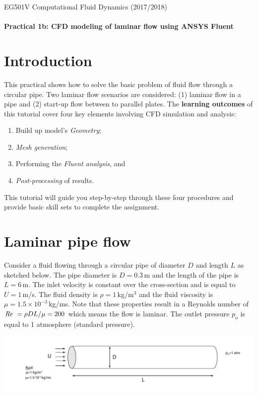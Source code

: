 \documentclass[11pt,a4paper,oneside,hidelinks]{scrartcl}
\newcommand\Rey{\mbox{\textit{Re}}\,\,}
\begin{document}
EG501V Computational Fluid Dynamics (2017/2018)
\\
\\
\textbf{Practical 1b: CFD modeling of laminar flow using ANSYS Fluent}

\section{Introduction}
This practical shows how to solve the basic problem of fluid flow through a circular pipe. Two laminar flow scenarios are considered: (1) laminar flow in a pipe and (2) start-up flow between to parallel plates. The {\bf learning outcomes} of this tutorial cover four key elements involving CFD simulation and  analysis:
\begin{enumerate}
  \item Build up model's \emph{Geometry};
  \item \emph{Mesh generation};
  \item Performing the \emph{Fluent analysis}, and
  \item \emph{Post-processing} of results.
\end{enumerate}
This tutorial will guide you step-by-step through these four procedures and provide basic skill sets to complete the assignment.

\section{Laminar pipe flow}\label{Section:LaminarPipeSimple}
Consider a fluid flowing through a circular pipe of diameter $D$ and length $L$ as sketched below. The pipe diameter is $D=0.3$\,m and the length of the pipe is $L=6$\,m. The inlet velocity  is constant over the cross-section and is equal to $U=1$\,m/s. The  fluid density is $\rho=1$\,kg/m$^3$ and the fluid viscosity is $\mu=1.5\times10^{-3}$\,kg/ms. Note that these properties result in a Reynolds number of $\Rey=\rho DL/\mu=200$ which means the flow is laminar. The outlet pressure $p_\mathrm{o}$ is equal to 1 atmosphere (standard pressure).\\
\begin{center}
\includegraphics[width=\textwidth,clip]{pipe_sketch.pdf}
\end{center}
\end{document}

